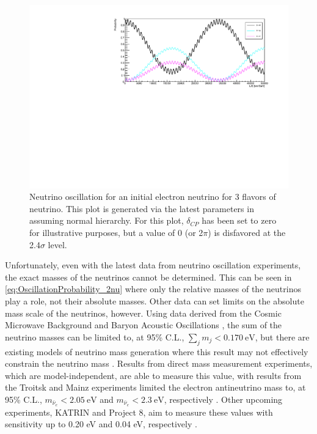 \begin{figure}[tbph]
\centering
\includegraphics[width=0.9\linewidth]{Figures/Oscillation_2017Params_0CP.pdf}
\caption[Neutrino oscillation for an initial electron neutrino for 3 flavors of neutrino.]{Neutrino oscillation for an initial electron neutrino for 3 flavors of neutrino. This plot is generated via the latest parameters in \cite{Patrignani:2016xqp} assuming normal hierarchy. For this plot, $\delta_{CP}$ has been set to zero for illustrative purposes, but a value of 0 (or 2$\pi$) is disfavored at the 2.4$\sigma$ level.}
\label{fig:Oscillations_electron_long}
\end{figure}


Unfortunately, even with the latest data from neutrino oscillation experiments, the exact masses of the neutrinos cannot be determined. This can be seen in \autoref{eq:OscillationProbability_2nu} where only the relative masses of the neutrinos play a role, not their absolute masses. Other data can set limits on the absolute mass scale of the neutrinos, however. Using data derived from the Cosmic Microwave Background and Baryon Acoustic Oscillations \cite{refId0}, the sum of the neutrino masses can be limited to, at 95\% C.L., $\sum_j m_j < 0.170~\textrm{eV}$, but there are existing models of neutrino mass generation where this result may not effectively constrain the neutrino mass \cite{Koksbang:2017rux} \cite{PhysRevLett.94.111801}. Results from direct mass measurement experiments, which are model-independent, are able to measure this value, with results from the Troitsk and Mainz experiments limited the electron antineutrino mass to, at 95\% C.L., $m_{\bar{\nu}_e} < 2.05~\textrm{eV}$ and $m_{\bar{\nu}_e} < 2.3~\textrm{eV}$, respectively \cite{Aseev:2011dq} \cite{Kraus:2004zw}. Other upcoming experiments, KATRIN and Project 8, aim to measure these values with sensitivity up to 0.20 eV  and 0.04 eV, respectively \cite{Robertson:2013ziv} \cite{Esfahani:2017dmu}.

